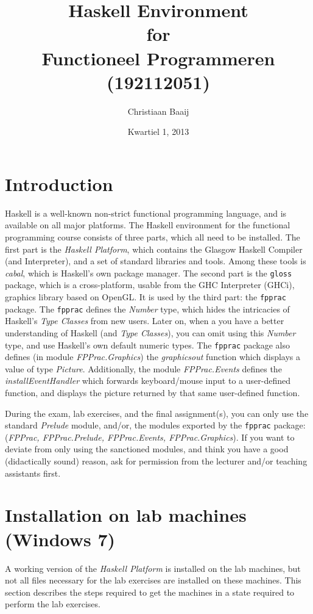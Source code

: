 \documentclass[]{article}
\title{Haskell Environment \\ for \\ Functioneel Programmeren (192112051)}
\author{Christiaan Baaij}
\date{Kwartiel 1, 2013}
\begin{document}

\maketitle

\section{Introduction}
Haskell is a well-known non-strict functional programming language, and is available on all major platforms.
The Haskell environment for the functional programming course consists of three parts, which all need to be installed.
The first part is the \emph{Haskell Platform}, which contains the Glasgow Haskell Compiler (and Interpreter), and a set of standard libraries and tools.
Among these tools is \emph{cabal}, which is Haskell's own package manager. The second part is the \texttt{gloss} package, which is a cross-platform, usable from the GHC Interpreter (GHCi), graphics library based on OpenGL.
It is used by the third part: the \texttt{fpprac} package. The \texttt{fpprac} defines the \emph{Number} type, which hides the intricacies of Haskell's \emph{Type Classes} from new users.
Later on, when a you have a better understanding of Haskell (and \emph{Type Classes}), you can omit using this \emph{Number} type, and use Haskell's own default numeric types.
The \texttt{fpprac} package also defines (in module \emph{FPPrac.Graphics}) the \emph{graphicsout} function which displays a value of type \emph{Picture}. Additionally, the module \emph{FPPrac.Events} defines the \emph{installEventHandler} which forwards keyboard/mouse input to a user-defined function, and displays the picture returned by that same user-defined function.

During the exam, lab exercises, and the final assignment(s), you can only use the standard \emph{Prelude} module, and/or, the modules exported by the \texttt{fpprac} package: (\emph{FPPrac, FPPrac.Prelude, FPPrac.Events, FPPrac.Graphics}).
If you want to deviate from only using the sanctioned modules, and think you have a good (didactically sound) reason, ask for permission from the lecturer and/or teaching assistants first.

\section{Installation on lab machines (Windows 7)}
A working version of the \emph{Haskell Platform} is installed on the lab machines, but not all files necessary for the lab exercises are installed on these machines.
This section describes the steps required to get the machines in a state required to perform the lab exercises.
\end{document}
